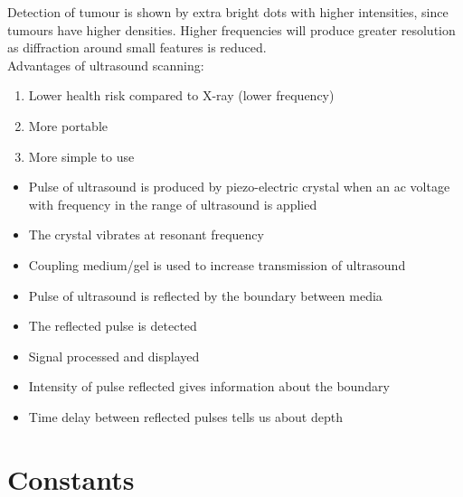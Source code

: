 \documentclass{article}
\begin{document}
Detection of tumour is shown by extra bright dots with higher intensities, since tumours have higher densities. Higher frequencies will produce greater resolution as diffraction around small features is reduced.\\
Advantages of ultrasound scanning:
\begin{enumerate}
    \item Lower health risk compared to X-ray (lower frequency)
    \item More portable
    \item More simple to use
\end{enumerate}

\begin{tcolorbox}[colframe=black!20!white,title=
\textcolor{red}{****Explain the principles of ultrasound. (6m)}]
\begin{itemize}
\color{red}
    \item Pulse of ultrasound is produced by piezo-electric crystal when an ac voltage with frequency in the range of ultrasound is applied
    \item The crystal vibrates at resonant frequency 
    \item Coupling medium/gel is used to increase transmission of ultrasound 
    \item Pulse of ultrasound is reflected by the boundary between media
    \item The reflected pulse is detected
    \item Signal processed and displayed
    \item Intensity of pulse reflected gives information about the boundary
    \item Time delay between reflected pulses tells us about depth

\end{itemize}
\end{tcolorbox}
\newpage 
{}
\section*{Constants}
\end{document}
